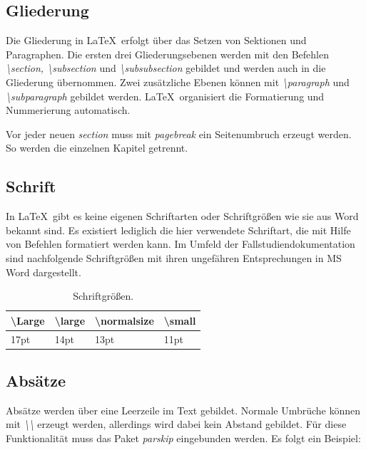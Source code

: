		\subsection{Gliederung}
		\label{ch:Gliederung}
		Die Gliederung in \LaTeX \ erfolgt über das Setzen von Sektionen und Paragraphen. Die ersten drei Gliederungsebenen werden mit den Befehlen \textit{\textbackslash section, \textbackslash subsection} und \textit{\textbackslash subsubsection} gebildet und werden auch in die Gliederung übernommen. Zwei zusätzliche Ebenen können mit \textit{\textbackslash paragraph} und \textit{\textbackslash subparagraph} gebildet werden. \LaTeX \ organisiert die Formatierung und Nummerierung automatisch.

		Vor jeder neuen \textit{section} muss mit \textit{pagebreak} ein Seitenumbruch erzeugt werden. So werden die einzelnen Kapitel getrennt.

		\subsection{Schrift}
		\label{ch:schrift}
		In \LaTeX \ gibt es keine eigenen Schriftarten oder Schriftgrößen wie sie aus Word bekannt sind. Es existiert lediglich die hier verwendete Schriftart, die mit Hilfe von Befehlen formatiert werden kann. Im Umfeld der Fallstudiendokumentation sind nachfolgende Schriftgrößen mit ihren ungefähren Entsprechungen in MS Word dargestellt.

		\begin{table}[H]
			\centering
			\begin{tabular}{|l|l|l|l|}
				\hline  \textbackslash Large& \textbackslash large & \textbackslash normalsize & \textbackslash small \\
				\hline  17pt & 14pt & 13pt & 11pt   \\
				\hline
			\end{tabular}
			\caption{Schriftgrößen.} %
			\label{tab:schriftgroessen}
		\end{table}

		\subsection{Absätze}
		\label{ch:absaetze}
		Absätze werden über eine Leerzeile im Text gebildet. Normale Umbrüche können mit \textit{\textbackslash\textbackslash} erzeugt werden, allerdings wird dabei kein Abstand gebildet. Für diese Funktionalität muss das Paket \textit{parskip} eingebunden werden. Es folgt ein Beispiel:

